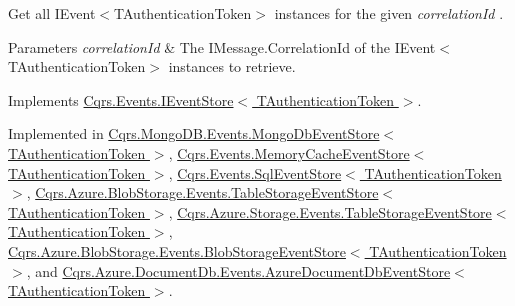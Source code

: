 Get all I\+Event$<$\+T\+Authentication\+Token$>$ instances for the given {\itshape correlation\+Id} . 


\begin{DoxyParams}{Parameters}
{\em correlation\+Id} & The I\+Message.\+Correlation\+Id of the I\+Event$<$\+T\+Authentication\+Token$>$ instances to retrieve.\\
\hline
\end{DoxyParams}


Implements \hyperlink{interfaceCqrs_1_1Events_1_1IEventStore_af398bb6768fa661ad97a9fa9ecfbd9fb_af398bb6768fa661ad97a9fa9ecfbd9fb}{Cqrs.\+Events.\+I\+Event\+Store$<$ T\+Authentication\+Token $>$}.



Implemented in \hyperlink{classCqrs_1_1MongoDB_1_1Events_1_1MongoDbEventStore_ac886ca0a57ad86cb99ef0a3767db9280_ac886ca0a57ad86cb99ef0a3767db9280}{Cqrs.\+Mongo\+D\+B.\+Events.\+Mongo\+Db\+Event\+Store$<$ T\+Authentication\+Token $>$}, \hyperlink{classCqrs_1_1Events_1_1MemoryCacheEventStore_a2a93a3f10423f608527fbc41a7ce8cef_a2a93a3f10423f608527fbc41a7ce8cef}{Cqrs.\+Events.\+Memory\+Cache\+Event\+Store$<$ T\+Authentication\+Token $>$}, \hyperlink{classCqrs_1_1Events_1_1SqlEventStore_ac1fb2bdec07cbeec57fb3d985e7a8b31_ac1fb2bdec07cbeec57fb3d985e7a8b31}{Cqrs.\+Events.\+Sql\+Event\+Store$<$ T\+Authentication\+Token $>$}, \hyperlink{classCqrs_1_1Azure_1_1BlobStorage_1_1Events_1_1TableStorageEventStore_a9b952a9257dc6f458b98eba87684412e_a9b952a9257dc6f458b98eba87684412e}{Cqrs.\+Azure.\+Blob\+Storage.\+Events.\+Table\+Storage\+Event\+Store$<$ T\+Authentication\+Token $>$}, \hyperlink{classCqrs_1_1Azure_1_1Storage_1_1Events_1_1TableStorageEventStore_a1b436bbb111b14b85ee6ba7f90fb1a35_a1b436bbb111b14b85ee6ba7f90fb1a35}{Cqrs.\+Azure.\+Storage.\+Events.\+Table\+Storage\+Event\+Store$<$ T\+Authentication\+Token $>$}, \hyperlink{classCqrs_1_1Azure_1_1BlobStorage_1_1Events_1_1BlobStorageEventStore_a660c786205693ee34a11e205c6d136ad_a660c786205693ee34a11e205c6d136ad}{Cqrs.\+Azure.\+Blob\+Storage.\+Events.\+Blob\+Storage\+Event\+Store$<$ T\+Authentication\+Token $>$}, and \hyperlink{classCqrs_1_1Azure_1_1DocumentDb_1_1Events_1_1AzureDocumentDbEventStore_ac59ce599b768ce047869b8ac135f4e22_ac59ce599b768ce047869b8ac135f4e22}{Cqrs.\+Azure.\+Document\+Db.\+Events.\+Azure\+Document\+Db\+Event\+Store$<$ T\+Authentication\+Token $>$}.

\mbox{\label{classCqrs_1_1Events_1_1EventStore_aa6ffed5d7dd365600669149da29f9e89_aa6ffed5d7dd365600669149da29f9e89}} 
